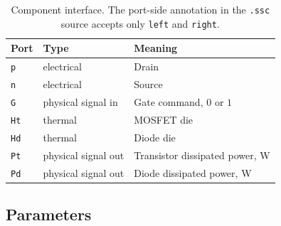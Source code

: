 \documentclass[11pt,a4paper]{article}
\begin{document}
\begin{table}[h]
\centering
\begin{tabular}{llp{85mm}}
\toprule
Port & Type & Meaning \\
\midrule
\texttt{p}  & electrical         & Drain \\
\texttt{n}  & electrical         & Source \\
\texttt{G}  & physical signal in & Gate command, $0$ or $1$ \\
\texttt{Ht} & thermal            & MOSFET die \\
\texttt{Hd} & thermal            & Diode die \\
\texttt{Pt} & physical signal out& Transistor dissipated power, \si{\watt} \\
\texttt{Pd} & physical signal out& Diode dissipated power, \si{\watt} \\
\bottomrule
\end{tabular}
\caption{Component interface. The port-side annotation in the \texttt{.ssc}
source accepts only \texttt{left} and \texttt{right}.}
\end{table}

\subsection{Parameters}
\end{document}
